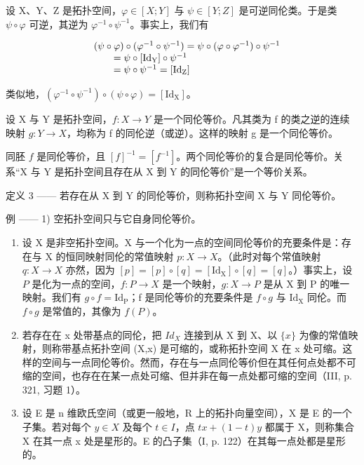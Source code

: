 设 X、Y、Z 是拓扑空间，\(\varphi \in [X;Y]\) 与 \(\psi \in [Y;Z]\) 是可逆同伦类。于是类 \(\psi \circ \varphi\) 可逆，其逆为 \(\varphi^{-1} \circ \psi^{-1}\)。事实上，我们有

\[
\begin{array}{r l} & (\psi \circ \varphi) \circ (\varphi^ {- 1} \circ \psi^ {- 1}) = \psi \circ (\varphi \circ \varphi^ {- 1}) \circ \psi^ {- 1} \\ & \qquad = \psi \circ [ \mathrm{Id} _ {\mathrm{Y}} ] \circ \psi^ {- 1} \\ & \qquad = \psi \circ \psi^ {- 1} = [ \mathrm{Id} _ {\mathrm{Z}} ] \end{array}
\]

类似地，\((\varphi^{-1} \circ \psi^{-1}) \circ (\psi \circ \varphi) = [\mathrm{Id}_{\mathrm{X}}]\)。

设 X 与 Y 是拓扑空间，\(f: X \to Y\) 是一个同伦等价。凡其类为 f 的类之逆的连续映射 \(g: Y \to X\)，均称为 f 的同伦逆（或逆）。这样的映射 g 是一个同伦等价。

同胚 \(f\) 是同伦等价，且 \([f]^{-1} = [f^{-1}]\)。两个同伦等价的复合是同伦等价。关系“X 与 Y 是拓扑空间且存在从 X 到 Y 的同伦等价”是一个等价关系。

定义 3 —— 若存在从 X 到 Y 的同伦等价，则称拓扑空间 X 与 Y 同伦等价。

例 —— 1) 空拓扑空间只与它自身同伦等价。

\begin{enumerate}
\def\labelenumi{\arabic{enumi})}
\setcounter{enumi}{1}
\item
  设 X 是非空拓扑空间。X 与一个化为一点的空间同伦等价的充要条件是：存在与 X 的恒同映射同伦的常值映射 \(p: X \rightarrow X\)。（此时对每个常值映射 \(q \colon X \to X\) 亦然，因为 \([p] = [p] \circ [q] = [\mathrm{Id}_{\mathrm{X}}] \circ [q] = [q]\)。）事实上，设 \(P\) 是化为一点的空间，\(f \colon P \to X\) 是一个映射，\(g \colon X \to P\) 是从 X 到 P 的唯一映射。我们有 \(g \circ f = \mathrm{Id}_{\mathrm{P}}\)；f 是同伦等价的充要条件是 \(f \circ g\) 与 \(\mathrm{Id}_{\mathrm{X}}\) 同伦。而 \(f \circ g\) 是常值的，其像为 \(f(P)\)。
\item
  若存在在 x 处带基点的同伦，把 \(Id_{X}\) 连接到从 X 到 X、以 \(\{x\}\) 为像的常值映射，则称带基点拓扑空间 (X,x) 是可缩的，或称拓扑空间 X 在 x 处可缩。这样的空间与一点同伦等价。然而，存在与一点同伦等价但在其任何点处都不可缩的空间，也存在在某一点处可缩、但并非在每一点处都可缩的空间（III, p. 321, 习题 1）。
\item
  设 E 是 n 维欧氏空间（或更一般地，R 上的拓扑向量空间），X 是 E 的一个子集。若对每个 \(y \in X\) 及每个 \(t \in I\)，点 \(tx + (1 - t)y\) 都属于 X，则称集合 X 在其一点 x 处是星形的。E 的凸子集（I, p. 122）在其每一点处都是星形的。
\end{enumerate}

